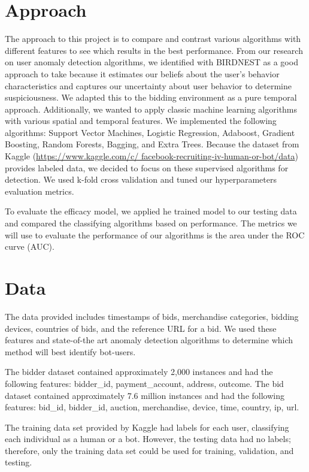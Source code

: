 \documentclass{article} %
\begin{document}
\section{Approach}

The approach to this project is to compare and contrast various algorithms with different features to see which results in the best performance. From our research on user anomaly detection algorithms, we identified with BIRDNEST as a good approach to take because it estimates our beliefs about the user's behavior characteristics and captures our uncertainty about user behavior to determine suspiciousness. We adapted this to the bidding environment as a pure temporal approach. Additionally, we wanted to apply classic machine learning algorithms with various spatial and temporal features. We implemented the following algorithms: Support Vector Machines, Logistic Regression, Adaboost, Gradient Boosting, Random Forests, Bagging, and Extra Trees. 
Because the dataset from Kaggle (\url{https://www.kaggle.com/c/ facebook-recruiting-iv-human-or-bot/data}) provides labeled data, we decided to focus on these supervised algorithms for detection.
We used k-fold cross validation and tuned our hyperparameters evaluation metrics. 

To evaluate the efficacy model, we applied he trained model to our testing data and compared the classifying algorithms based on performance.
The metrics we will use to evaluate the performance of our algorithms is the area under the ROC curve (AUC). 

\section{Data}

The data provided includes timestamps of bids, merchandise categories, bidding devices, countries of bids, and the reference URL for a bid.
We used these features and state-of-the art anomaly detection algorithms to determine which method will best identify bot-users.

The bidder dataset contained approximately 2,000 instances and had the following features: bidder\_id, payment\_account, address, outcome.
The bid dataset contained approximately 7.6 million instances and had the following features: bid\_id, bidder\_id, auction, merchandise, device, time, country, ip, url.

The training data set provided by Kaggle had labels for each user, classifying each individual as a human or a bot.
However, the testing data had no labels; therefore, only the training data set could be used for training, validation, and testing.
\end{document}
